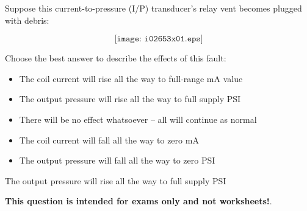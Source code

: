 

Suppose this current-to-pressure (I/P) transducer's relay vent becomes plugged with debris:

$$\texttt{[image: i02653x01.eps]}$$

\noindent
Choose the best answer to describe the effects of this fault:

\begin{itemize}
\item{} The coil current will rise all the way to full-range mA value
\vskip 10pt
\item{} The output pressure will rise all the way to full supply PSI 
\vskip 10pt
\item{} There will be no effect whatsoever -- all will continue as normal
\vskip 10pt
\item{} The coil current will fall all the way to zero mA 
\vskip 10pt
\item{} The output pressure will fall all the way to zero PSI
\end{itemize}







The output pressure will rise all the way to full supply PSI 







{\bf This question is intended for exams only and not worksheets!}.



